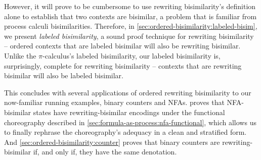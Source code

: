 However, it will prove to be cumbersome to use rewriting bisimilarity's definition alone to establish that two contexts are bisimilar, a problem that is familiar from process calculi bisimilarities.
Therefore, in \cref{sec:ordered-bisimilarity:labeled-bisim}, we present \emph{labeled bisimilarity}, a sound proof technique for rewriting bisimilarity -- ordered contexts that are labeled bisimilar will also be rewriting bisimilar.
Unlike the $\pi$-calculus's labeled bisimilarity, our labeled bisimilarity is, surprisingly, complete for rewriting bisimilarity -- contexts that are rewriting bisimilar will also be labeled bisimilar.

This  concludes with several applications of ordered rewriting bisimilarity to our now-familiar running examples, binary counters and \aclp*{NFA}.
 proves that \ac{NFA}-bisimilar states have rewriting-bisimilar encodings under the functional choreography described in \cref{sec:formula-as-process:nfa-functional}, which allows us to finally rephrase the choreography's adequacy in a clean and stratified form.
And \cref{sec:ordered-bisimilarity:counter} proves that binary counters are rewriting-bisimilar if, and only if, they have the same denotation.






